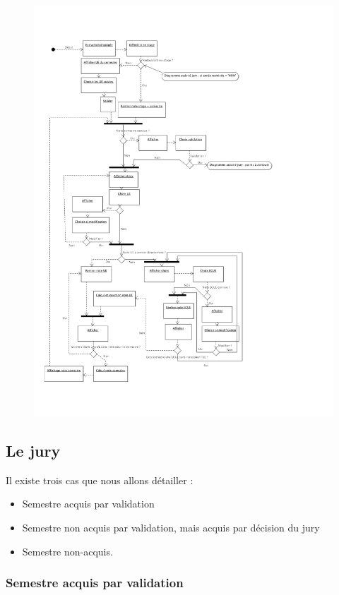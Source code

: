 \documentclass[letter, 11pt] {article}
\begin{document}
		\begin{figure}[htbp]
				\includegraphics[scale = 0.4]{../Diagramme_activite/Diagramme_notation.png}
		\end{figure}
		
		
		\subsection{Le jury}
	
		Il existe trois cas que nous allons détailler :
		\begin{itemize}
			\item{Semestre acquis par validation}
			\item{Semestre non acquis par validation, mais acquis par décision du jury}
			\item{Semestre non-acquis.}
		\end{itemize}

			\subsubsection*{Semestre acquis par validation}
\end{document}
